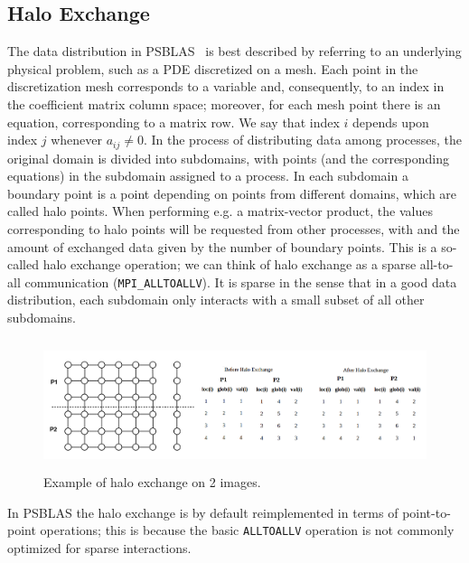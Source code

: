 \documentclass{IOS-Book-Article}
\begin{document}
\subsection{Halo Exchange}

The data distribution in  PSBLAS~\cite{PSBLAS} is best described by
referring to an underlying physical problem, such as a PDE discretized
on a mesh.
Each point in the discretization mesh corresponds to a variable and,
consequently, to an index in the coefficient matrix column space;
moreover, for each mesh point there is an equation, corresponding to a
matrix row. We say that index $i$ depends upon index $j$ whenever $a_{ij}\neq0$.  
In the process of distributing data among processes, the original
domain is divided into subdomains, with points (and the corresponding
equations) in the subdomain assigned to a process.  In each subdomain
a boundary point is a point depending on points from different
domains, which are called halo points. 
When performing e.g. a matrix-vector product, the
values corresponding to halo points will be requested from other
processes, with and the amount of exchanged data given by the number 
of boundary points.   This is a so-called halo exchange 
operation; we can think of halo exchange as a sparse all-to-all
communication (\verb|MPI_ALLTOALLV|). It is sparse in the  sense that
in a good data distribution, each subdomain only interacts with a
small subset of all other subdomains. 
\begin{figure}
\includegraphics[height=1.5in, width=4.65in]{halo2.png}
\caption{Example of halo exchange on 2 images. }
\end{figure}
In  PSBLAS the halo exchange is by default reimplemented in terms of
point-to-point operations; this is because the basic 
\verb|ALLTOALLV| operation is not commonly optimized for sparse
interactions.
\end{document}
